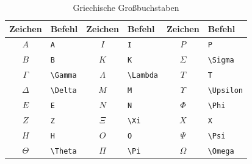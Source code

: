 \documentclass[a4paper,10pt,twoside]{scrbook}
\begin{document}
\begin{table}[h!tb]
\centering
\caption{Griechische Großbuchstaben}
\label{Tabelle_Griechische_Buchstaben1}       %
\begin{tabular}{clclcl}
\hline
Zeichen & Befehl & Zeichen & Befehl & Zeichen & Befehl \\
\hline
\(A\)      & \texttt{A}                    & \(I\)       & \texttt{I}                     & \(P\)        & \texttt{P}\\
\(B\)      & \texttt{B}                    & \(K\)       & \texttt{K}                     & \(\Sigma\)   & \texttt{\textbackslash Sigma} \\
\(\Gamma\) & \texttt{\textbackslash Gamma} & \(\Lambda\) & \texttt{\textbackslash Lambda} & \(T\)        & \texttt{T}\\
\(\Delta\) & \texttt{\textbackslash Delta} & \(M\)       & \texttt{M}                     & \(\Upsilon\) & \texttt{\textbackslash Upsilon} \\
\(E\)      & \texttt{E}                    & \(N\)       & \texttt{N}                     & \(\Phi\)     & \texttt{\textbackslash Phi}\\
\(Z\)      & \texttt{Z}                    & \(\Xi\)     & \texttt{\textbackslash Xi}     & \(X\)        & \texttt{X}\\
\(H\)      & \texttt{H}                    & \(O\)       & \texttt{O}                     & \(\Psi\)     & \texttt{\textbackslash Psi}\\
\(\Theta\) & \texttt{\textbackslash Theta} & \(\Pi\)     & \texttt{\textbackslash Pi}     & \(\Omega\)   & \texttt{\textbackslash Omega} \\
\hline
\end{tabular}
\end{table}
\end{document}
